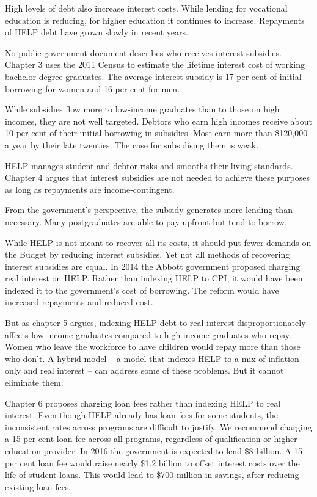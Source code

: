 \documentclass[embargoed]{grattan}
\begin{document}
High levels of debt also increase interest costs. While lending for vocational education is reducing, for higher education it continues to increase. Repayments of HELP debt have grown slowly in recent years.

No public government document describes who receives interest subsidies. Chapter 3 uses the 2011 Census to estimate the lifetime interest cost of working bachelor degree graduates. The average interest subsidy is 17 per cent of initial borrowing for women and 16 per cent for men.

While subsidies flow more to low-income graduates than to those on high incomes, they are not well targeted. Debtors who earn high incomes receive about 10 per cent of their initial borrowing in subsidies. Most earn more than \$120,000 a year by their late twenties. The case for subsidising them is weak.

HELP manages student and debtor risks and smooths their living standards. Chapter 4 argues that interest subsidies are not needed to achieve these purposes as long as repayments are income-contingent.

From the government's perspective, the subsidy generates more lending than necessary. Many postgraduates are able to pay upfront but tend to borrow.

While HELP is not meant to recover all its costs, it should put fewer demands on the Budget by reducing interest subsidies. Yet not all methods of recovering interest subsidies are equal. In 2014 the Abbott government proposed charging real interest on HELP. Rather than indexing HELP to CPI, it would have been indexed it to the government's cost of borrowing. The reform would have increased repayments and reduced cost.

But as chapter 5 argues, indexing HELP debt to real interest disproportionately affects low-income graduates compared to high-income graduates who repay. Women who leave the workforce to have children would repay more than those who don't. A hybrid model -- a model that indexes HELP to a mix of inflation-only and real interest -- can address some of these problems. But it cannot eliminate them.

Chapter 6 proposes charging loan fees rather than indexing HELP to real interest. Even though HELP already has loan fees for some students, the inconsistent rates across programs are difficult to justify. We recommend charging a 15 per cent loan fee across all programs, regardless of qualification or higher education provider. In 2016 the government is expected to lend \$8 billion. A 15 per cent loan fee would raise nearly \$1.2 billion to offset interest costs over the life of student loans. This would lead to \$700 million in savings, after reducing existing loan fees.
\end{document}
